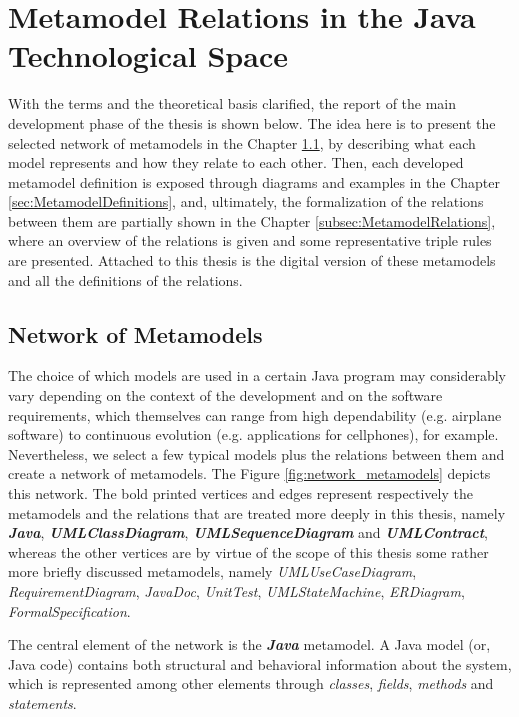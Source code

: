 \documentclass[tuberlin,cic,tc,english,noabntcite, oneside]{iiufrgs}
\begin{document}
\chapter{Metamodel Relations in the Java Technological Space}
\label{chapter:metamodel_relations}
With the terms and the theoretical basis clarified, the report of the main development phase of the thesis is shown below. The idea here is to present the selected network of metamodels in the Chapter \ref{sec:NetworkMetamodels}, by describing what each model represents and how they relate to each other. Then, each developed metamodel definition is exposed through diagrams and examples in the Chapter \ref{sec:MetamodelDefinitions}, and, ultimately, the formalization of the relations between them are partially shown in the Chapter \ref{subsec:MetamodelRelations}, where an overview of the relations is given and some representative triple rules are presented. Attached to this thesis is the digital version of these metamodels and all the definitions of the relations.

\section{Network of Metamodels}
\label{sec:NetworkMetamodels}
The choice of which models are used in a certain Java program may considerably vary depending on the context of the development and on the software requirements, which themselves can range from high dependability (e.g. airplane software) to continuous evolution (e.g. applications for cellphones), for example. Nevertheless, we select a few typical models plus the relations between them and create a network of metamodels. The Figure \ref{fig:network_metamodels} depicts this network. The bold printed vertices and edges represent respectively the metamodels and the relations that are treated more deeply in this thesis, namely \textbf{\emph{Java}}, \textbf{\emph{UMLClassDiagram}}, \textbf{\emph{UMLSequenceDiagram}} and \textbf{\emph{UMLContract}}, whereas the other vertices are by virtue of the scope of this thesis some rather more briefly discussed metamodels, namely \emph{UMLUseCaseDiagram}, \emph{RequirementDiagram}, \emph{JavaDoc}, \emph{UnitTest}, \emph{UMLStateMachine}, \emph{ERDiagram}, \emph{FormalSpecification}.

The central element of the network is the \textbf{\emph{Java}} metamodel. A Java model (or, Java code) contains both structural and behavioral information about the system, which is represented among other elements through \emph{classes}, \emph{fields}, \emph{methods} and \emph{statements}.
\end{document}
